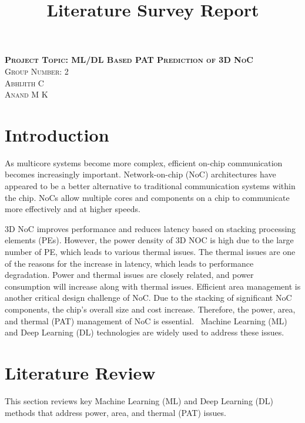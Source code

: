 \documentclass[conference]{IEEEtran}
\begin{document}
\title{Literature Survey Report}

\author{} %

\maketitle

\begin{center}
    \textsc{\large \textbf{ Project Topic: ML/DL Based PAT Prediction of 3D NoC}}\\[0.5cm]
    
    \textsc{\large Group Number: 2}\\[0.2cm] %
    \textsc{Abhijith C}\\
    \textsc{Anand M K}\\[1cm]
\end{center}

\section{Introduction}
As multicore systems become more complex, efficient on-chip communication becomes increasingly important. Network-on-chip (NoC) architectures have appeared to be a better alternative to traditional communication systems within the chip. NoCs allow multiple cores and components on a chip to communicate more effectively and at higher speeds.  

3D NoC improves performance and reduces latency based on stacking processing elements (PEs). However, the power density of 3D NOC is high due to the large number of PE, which leads to various thermal issues. The thermal issues are one of the reasons for the increase in latency, which leads to performance degradation. Power and thermal issues are closely related, and power consumption will increase along with thermal issues. Efficient area management is another critical design challenge of NoC. Due to the stacking of significant NoC components, the chip's overall size and cost increase. Therefore, the power, area, and thermal (PAT) management of NoC is essential.  Machine Learning (ML) and Deep Learning (DL) technologies are widely used to address these issues. 
\section{Literature Review}
This section reviews key Machine Learning (ML) and Deep Learning (DL) methods that address power, area, and thermal (PAT) issues. 
\end{document}
